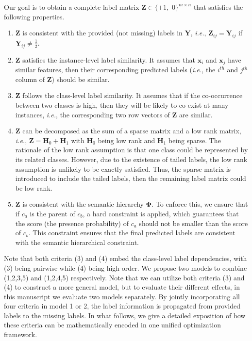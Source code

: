 \documentclass[twocolumn]{svjour3}          %
\newcommand{\x}{\mathbf{x}}
\newcommand{\Z}{\mathbf{Z}}
\newcommand{\HH}{\mathbf{H}}
\begin{document}
Our goal is to obtain a complete label matrix $\mathbf{Z} \in \{+1,$ $0\}^{m \times n}$ that satisfies the following properties.
\begin{enumerate}
\item 
$\mathbf{Z}$ is consistent with the provided (not missing) labels in $\mathbf{Y}$, {\it i.e.}, $\mathbf{Z}_{ij} = \mathbf{Y}_{ij}$ if $\mathbf{Y}_{ij} \neq \frac{1}{2}$. 
\item 
$\mathbf{Z}$ satisfies the instance-level label similarity. It assumes that $\x_i$ and $\x_j$ have similar features, then their corresponding predicted labels ({\it i.e.}, the $i^{th}$ and $j^{th}$ column of $\mathbf{Z}$) should be similar. 
\item 
$\mathbf{Z}$ follows the class-level label similarity. It assumes that if the co-occurrence between two classes is high, then they will be likely to co-exist at many instances, {\it i.e.}, the corresponding two row vectors of $\mathbf{Z}$ are similar.
\item 
$\mathbf{Z}$ can be decomposed as the sum of a sparse matrix and a low rank matrix, {\it i.e.}, $\Z = \HH_0 + \HH_1$ with $\HH_0$ being low rank and $\HH_1$ being sparse. The rationale of the low rank assumption is that one class could be represented by its related classes. However, due to the existence of tailed labels, the low rank assumption is unlikely to be exactly satisfied. Thus, the sparse matrix is introduced to include the tailed labels, then the remaining label matrix could be low rank. 
\item 
$\mathbf{Z}$ is consistent with the semantic hierarchy $\mathbf{\Phi}$. To enforce this, we ensure that if $c_a$ is the parent of $c_b$, a hard constraint is applied, which guarantees that the score (the presence probability) of $c_a$ should not be smaller than the score of $c_b$. This constraint ensures that the final predicted labels are consistent with the semantic hierarchical constraint.
\end{enumerate} 

Note that both criteria (3) and (4) embed the class-level label dependencies, with (3) being pairwise while (4) being high-order. 
We propose two models to combine (1,2,3,5) and (1,2,4,5) respectively. Note that we can utilize both criteria (3) and (4) to construct a more general model, but to evaluate their different effects, in this manuscript we evaluate two models separately. 
By jointly incorporating all four criteria in model 1 or 2, the label information is propagated from provided labels to the missing labels. 
In what follows, we give a detailed exposition of how these criteria can be mathematically encoded in one unified optimization framework. 
\end{document}
